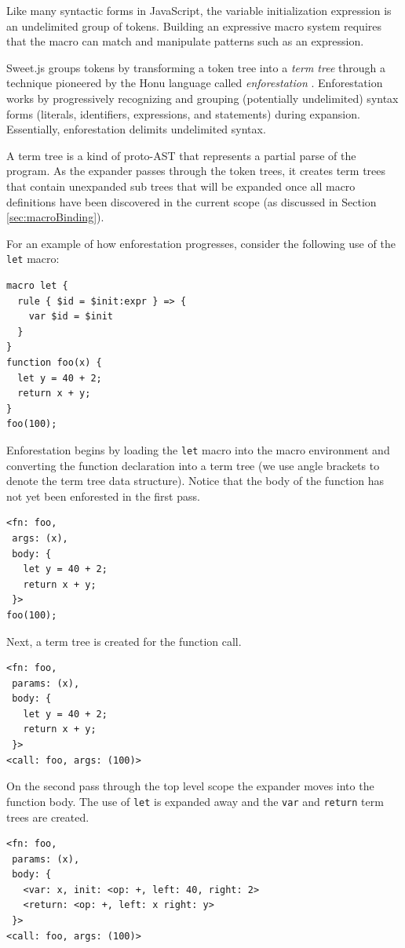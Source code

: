 \documentclass[preprint,10pt]{sigplanconf}
\begin{document}
Like many syntactic forms in JavaScript, the variable initialization
expression is an undelimited group of tokens. Building an expressive
macro system requires that the macro can match and manipulate patterns
such as an expression.

Sweet.js groups tokens by transforming a token tree into a \emph{term
  tree} through a technique pioneered by the Honu language called
\emph{enforestation} \cite{Rafkind2013}. Enforestation works by
progressively recognizing and grouping (potentially undelimited)
syntax forms (\eg literals, identifiers, expressions, and statements)
during expansion. Essentially, enforestation delimits undelimited
syntax.

A term tree is a kind of proto-AST that represents a partial parse of
the program. As the expander passes through the token trees, it
creates term trees that contain unexpanded sub trees that will be
expanded once all macro definitions have been discovered in the
current scope (as discussed in Section \ref{sec:macroBinding}).

For an example of how enforestation progresses, consider the following
use of the \verb!let! macro:
\begin{lstlisting}
macro let {
  rule { $id = $init:expr } => {
    var $id = $init
  }
}
function foo(x) {
  let y = 40 + 2;
  return x + y;
}
foo(100);
\end{lstlisting}
Enforestation begins by loading the \verb!let! macro into the macro
environment and converting the function declaration into a term tree
(we use angle brackets to denote the term tree data structure). Notice
that the body of the function has not yet been enforested in the first
pass.
\begin{lstlisting}
<fn: foo, 
 args: (x), 
 body: {
   let y = 40 + 2;
   return x + y;
 }>
foo(100);
\end{lstlisting}
Next, a term tree is created for the function call.
\begin{lstlisting}
<fn: foo, 
 params: (x), 
 body: {
   let y = 40 + 2;
   return x + y;
 }>
<call: foo, args: (100)>
\end{lstlisting}
On the second pass through the top level scope the expander moves into
the function body. The use of \verb!let! is expanded away and the
\verb!var! and \verb!return! term trees are created.
\begin{lstlisting}
<fn: foo, 
 params: (x), 
 body: {
   <var: x, init: <op: +, left: 40, right: 2>
   <return: <op: +, left: x right: y> 
 }>
<call: foo, args: (100)>
\end{lstlisting}
\end{document}
